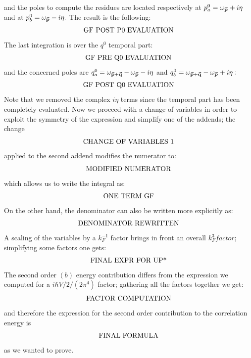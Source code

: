 \documentclass[a4paper]{article}
\begin{document}
and the poles to compute the residues are located respectively at $p^0_a = \omega_{\va{p}} + i\eta$ and at $p^0_b = \omega_{\va{p}} - i\eta.$
The result is the following:
\begin{align*}
 \qq{GF POST P0 EVALUATION}
\end{align*}
The last integration is over the $q^0$ temporal part:
\begin{align*}
\qq{GF PRE Q0 EVALUATION}
\end{align*}
and the concerned poles are $q^0_a = \omega_{\va{p}+\va{q}} -\omega_{\va{p}} -i \eta $ and $q^0_b = \omega_{\va{p}+\va{q}} -\omega_{\va{p}} +i \eta:$
\begin{align*}
\qq{GF POST Q0 EVALUATION}
\end{align*}
Note that we removed the complex $i\eta$ terms since the temporal part has been completely evaluated.
Now we proceed with a change of variables in order to exploit the symmetry of the expression and simplify one of the addends; the change
\begin{equation}
\qq{CHANGE OF VARIABLES 1}
\end{equation}
applied to the second addend modifies the numerator to:
\begin{equation}
\qq{MODIFIED NUMERATOR}
\end{equation}
which allows us to write the integral as:
\begin{align*}
\qq{ONE TERM GF}
\end{align*}
On the other hand, the denominator can also be written more explicitly as:
\begin{align*}
\qq{DENOMINATOR REWRITTEN}
\end{align*}
A scaling of the variables by a $k_F^{-1}$ factor brings in front an overall $k_F^3 factor;$ simplifying some factors one gets:
\begin{align*}
 \qq{FINAL EXPR FOR UP*}
\end{align*}
The second order $(b)$ energy contribution differs from the expression we computed for a $i\hbar V /2/(2\pi^4)$ factor; gathering all the factors together we get:
\begin{align*}
\qq{FACTOR COMPUTATION}
\end{align*}
and therefore the expression for the second order contribution to the correlation energy is
\begin{align}
\qq{FINAL FORMULA}
\end{align}
as we wanted to prove.
\end{document}
